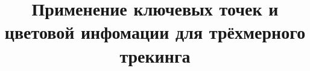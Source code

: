 \documentclass[a4paper, 14pt]{article}
\title{
    Применение ключевых точек и цветовой инфомации для трёхмерного трекинга
}
\begin{document}
\maketitle

\pagebreak
\tableofcontents
\newpage







\newpage


\end{document}
